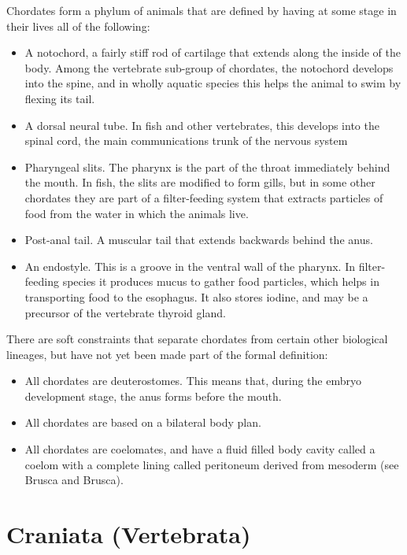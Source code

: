 \documentclass[]{book}
\providecommand{\tightlist}{%
  \setlength{\itemsep}{0pt}\setlength{\parskip}{0pt}}
\theoremstyle{definition}
\theoremstyle{definition}
\theoremstyle{definition}
\theoremstyle{remark}
\begin{document}
Chordates form a phylum of animals that are defined by having at some
stage in their lives all of the following:

\begin{itemize}
\tightlist
\item
  A notochord, a fairly stiff rod of cartilage that extends along the
  inside of the body. Among the vertebrate sub-group of chordates, the
  notochord develops into the spine, and in wholly aquatic species this
  helps the animal to swim by flexing its tail.
\item
  A dorsal neural tube. In fish and other vertebrates, this develops
  into the spinal cord, the main communications trunk of the nervous
  system
\item
  Pharyngeal slits. The pharynx is the part of the throat immediately
  behind the mouth. In fish, the slits are modified to form gills, but
  in some other chordates they are part of a filter-feeding system that
  extracts particles of food from the water in which the animals live.
\item
  Post-anal tail. A muscular tail that extends backwards behind the
  anus.
\item
  An endostyle. This is a groove in the ventral wall of the pharynx. In
  filter-feeding species it produces mucus to gather food particles,
  which helps in transporting food to the esophagus. It also stores
  iodine, and may be a precursor of the vertebrate thyroid gland.
\end{itemize}

There are soft constraints that separate chordates from certain other
biological lineages, but have not yet been made part of the formal
definition:

\begin{itemize}
\tightlist
\item
  All chordates are deuterostomes. This means that, during the embryo
  development stage, the anus forms before the mouth.
\item
  All chordates are based on a bilateral body plan.
\item
  All chordates are coelomates, and have a fluid filled body cavity
  called a coelom with a complete lining called peritoneum derived from
  mesoderm (see Brusca and Brusca).
\end{itemize}

\section{Craniata (Vertebrata)}\label{craniata-vertebrata}
\end{document}
